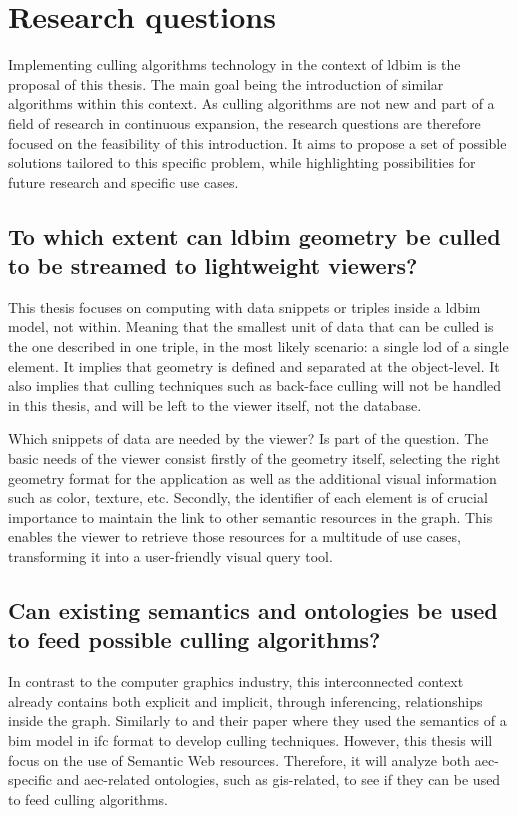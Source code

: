 \section{Research questions}
Implementing culling algorithms technology in the context of \ac{ldbim} is the proposal of this thesis. The main goal being the introduction of similar algorithms within this context. As culling algorithms are not new and part of a field of research in continuous expansion, the research questions are therefore focused on the feasibility of this introduction. It aims to propose a set of possible solutions tailored to this specific problem, while highlighting possibilities for future research and specific use cases.

\subsection[Can \acs{ldbim} be culled?]{To which extent can \acs{ldbim} geometry be culled \\
	to be streamed to lightweight viewers?}
This thesis focuses on computing with data snippets or triples inside a \ac{ldbim} model, not within. Meaning that the smallest unit of data that can be culled is the one described in one triple, in the most likely scenario: a single \ac{lod} of a single element. It implies that geometry is defined and separated at the object-level. It also implies that culling techniques such as back-face culling will not be handled in this thesis, and will be left to the viewer itself, not the database.

Which snippets of data are needed by the viewer? Is part of the question. The basic needs of the viewer consist firstly of the geometry itself, selecting the right geometry format for the application as well as the additional visual information such as color, texture, etc. Secondly, the identifier of each element is of crucial importance to maintain the link to other semantic resources in the graph. This enables the viewer to retrieve those resources for a multitude of use cases, transforming it into a user-friendly visual query tool.

\subsection[Can existing semantics be used?]{Can existing semantics and ontologies be used\\
	to feed possible culling algorithms?}
In contrast to the computer graphics industry, this interconnected context already contains both explicit and implicit, through inferencing, relationships inside the graph. Similarly to \cite{Johansson2009} and their paper where they used the semantics of a \ac{bim} model in \ac{ifc} format to develop culling techniques. However, this thesis will focus on the use of Semantic Web resources. Therefore, it will analyze both \ac{aec}-specific and \ac{aec}-related ontologies, such as \ac{gis}-related, to see if they can be used to feed culling algorithms.

